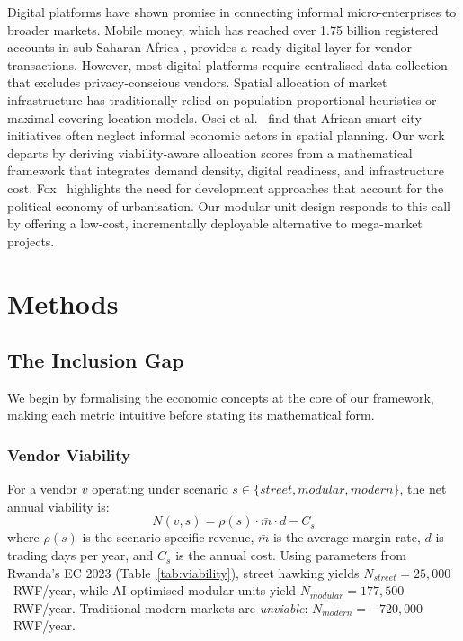 \documentclass{article}
\begin{document}
Digital platforms have shown promise in connecting informal micro-enterprises to broader markets.
Mobile money, which has reached over 1.75 billion registered accounts in sub-Saharan Africa \cite{suri2023fintech}, provides a ready digital layer for vendor transactions.
However, most digital platforms require centralised data collection that excludes privacy-conscious vendors.
Spatial allocation of market infrastructure has traditionally relied on population-proportional heuristics or maximal covering location models.
Osei et al.~ find that African smart city initiatives often neglect informal economic actors in spatial planning.
Our work departs by deriving viability-aware allocation scores from a mathematical framework that integrates demand density, digital readiness, and infrastructure cost.
Fox~ highlights the need for development approaches that account for the political economy of urbanisation. Our modular unit design responds to this call by offering a low-cost, incrementally deployable alternative to mega-market projects.

\section{Methods}
\label{sec:methodology}

\subsection{The Inclusion Gap}
\label{sec:problem}

We begin by formalising the economic concepts at the core of our framework, making each metric intuitive before stating its mathematical form.

\subsubsection{Vendor Viability}
For a vendor $v$ operating under scenario $s \in \{\textit{street}, \textit{modular}, \textit{modern}\}$, the net annual viability is:
\begin{equation}
    N(v,s) = \rho(s) \cdot \bar{m} \cdot d - C_s
    \label{eq:viability}
\end{equation}
where $\rho(s)$ is the scenario-specific revenue, $\bar{m}$ is the average margin rate, $d$ is trading days per year, and $C_s$ is the annual cost.
Using parameters from Rwanda's EC 2023 (Table~\ref{tab:viability}), street hawking yields $N_{\textit{street}} = 25{,}000$~RWF/year, while AI-optimised modular units yield $N_{\textit{modular}} = 177{,}500$~RWF/year.
Traditional modern markets are \emph{unviable}: $N_{\textit{modern}} = -720{,}000$~RWF/year.
\end{document}
